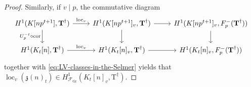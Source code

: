 \documentclass[12pt,reqno]{amsart}
\theoremstyle{definition}
\theoremstyle{remark}
\newcommand{\T}{\boldsymbol{\mathrm{T}}}
\DeclareMathOperator{\Cor}{cor}
\DeclareMathOperator{\loc}{loc}
\newcommand{\Gr}{\mathrm{Gr}}
\begin{document}
\begin{proof}
    Similarly, if $v\mid p$, the commutative diagram
		\begin{equation*}
		\begin{tikzcd}
	{H^1(K[np^{t+1}],\T^\dag)} & {H^1(K[np^{t+1}]_v,\T^{\dag})} & {H^1(K[np^{t+1}]_v,F^-_p(\T^{\dag}))} \\
	{H^1(K_t[n],\T^{\dag})} & {H^1(K_t[n]_v,\T^{\dag})} & {H^1(K_t[n]_v,F^-_p(\T^{\dag}))}
	\arrow["{\loc_v}", from=1-1, to=1-2]
	\arrow["{U_p^{-t}\circ\Cor}"', from=1-1, to=2-1]
	\arrow[from=1-2, to=1-3]
	\arrow[from=1-2, to=2-2]
	\arrow[from=1-3, to=2-3]
	\arrow["{\loc_v}", from=2-1, to=2-2]
	\arrow[from=2-2, to=2-3]
            \end{tikzcd}
		\end{equation*}
		together with \eqref{eq:LV-classes-in-the-Selmer} yields that $\loc_v(\mathfrak{z}(n)_{t})\in H^1_{\mathcal{F}_{\Gr}}(K_t[n]_v,\T^{\dag})$.
\end{proof}
\end{document}
